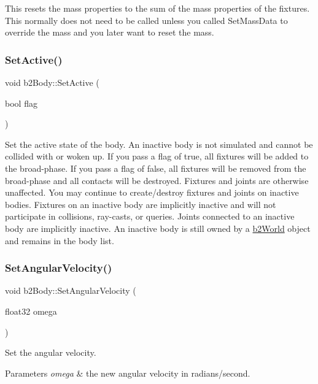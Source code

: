 This resets the mass properties to the sum of the mass properties of the fixtures. This normally does not need to be called unless you called Set\+Mass\+Data to override the mass and you later want to reset the mass. \mbox{\label{classb2_body_ab8059b7b3e3b64aee17b54f68f7dde80}} 
\subsubsection{\texorpdfstring{Set\+Active()}{SetActive()}}
{\footnotesize\ttfamily void b2\+Body\+::\+Set\+Active (\begin{DoxyParamCaption}\item[{bool}]{flag }\end{DoxyParamCaption})}

Set the active state of the body. An inactive body is not simulated and cannot be collided with or woken up. If you pass a flag of true, all fixtures will be added to the broad-\/phase. If you pass a flag of false, all fixtures will be removed from the broad-\/phase and all contacts will be destroyed. Fixtures and joints are otherwise unaffected. You may continue to create/destroy fixtures and joints on inactive bodies. Fixtures on an inactive body are implicitly inactive and will not participate in collisions, ray-\/casts, or queries. Joints connected to an inactive body are implicitly inactive. An inactive body is still owned by a \hyperlink{classb2_world}{b2\+World} object and remains in the body list. \mbox{\label{classb2_body_a37adc4160b84f73e8552a91cbde3f578}} 
\subsubsection{\texorpdfstring{Set\+Angular\+Velocity()}{SetAngularVelocity()}}
{\footnotesize\ttfamily void b2\+Body\+::\+Set\+Angular\+Velocity (\begin{DoxyParamCaption}\item[{float32}]{omega }\end{DoxyParamCaption})\hspace{0.3cm}{\ttfamily [inline]}}

Set the angular velocity. 
\begin{DoxyParams}{Parameters}
{\em omega} & the new angular velocity in radians/second. \\
\hline
\end{DoxyParams}
\mbox{\label{classb2_body_ac72ed3df52a26c33db82252ab57399af}} 
